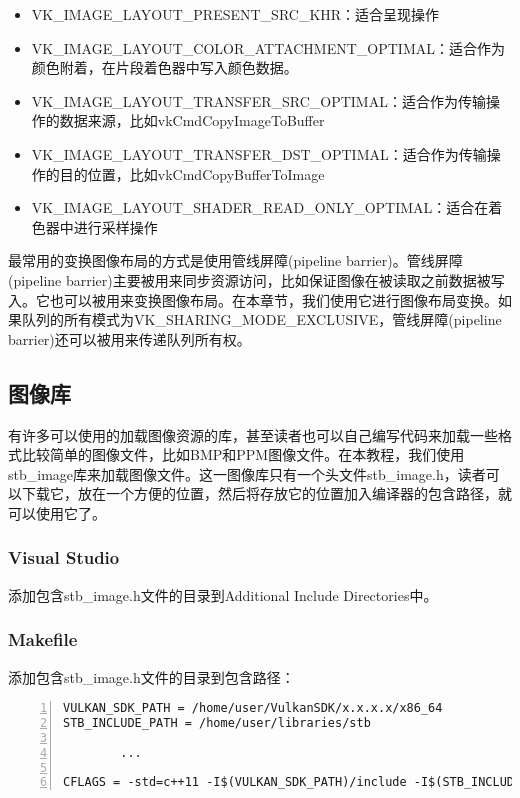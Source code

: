 \documentclass{ctexart}
\begin{document}
\begin{itemize}
	\item VK\_IMAGE\_LAYOUT\_PRESENT\_SRC\_KHR：适合呈现操作
	\item VK\_IMAGE\_LAYOUT\_COLOR\_ATTACHMENT\_OPTIMAL：适合作为颜色附着，在片段着色器中写入颜色数据。
	\item VK\_IMAGE\_LAYOUT\_TRANSFER\_SRC\_OPTIMAL：适合作为传输操作的数据来源，比如vkCmdCopyImageToBuffer
	\item VK\_IMAGE\_LAYOUT\_TRANSFER\_DST\_OPTIMAL：适合作为传输操作的目的位置，比如vkCmdCopyBufferToImage
	\item VK\_IMAGE\_LAYOUT\_SHADER\_READ\_ONLY\_OPTIMAL：适合在着色器中进行采样操作
\end{itemize}

最常用的变换图像布局的方式是使用管线屏障(pipeline barrier)。管线屏障(pipeline barrier)主要被用来同步资源访问，比如保证图像在被读取之前数据被写入。它也可以被用来变换图像布局。在本章节，我们使用它进行图像布局变换。如果队列的所有模式为VK\_SHARING\_MODE\_EXCLUSIVE，管线屏障(pipeline barrier)还可以被用来传递队列所有权。

\subsection{图像库}

有许多可以使用的加载图像资源的库，甚至读者也可以自己编写代码来加载一些格式比较简单的图像文件，比如BMP和PPM图像文件。在本教程，我们使用stb\_image库来加载图像文件。这一图像库只有一个头文件stb\_image.h，读者可以下载它，放在一个方便的位置，然后将存放它的位置加入编译器的包含路径，就可以使用它了。

\subsubsection{Visual Studio}

添加包含stb\_image.h文件的目录到Additional Include Directories中。

\subsubsection{Makefile}

添加包含stb\_image.h文件的目录到包含路径：

\begin{lstlisting}[language={[ANSI]C},keywordstyle=\color{blue!70},commentstyle=\color{red!50!green!50!blue!50},frame=shadowbox, rulesepcolor=\color{red!20!green!20!blue!20},basicstyle=\small,numbers=left, numberstyle=\tiny,breaklines=true]
VULKAN_SDK_PATH = /home/user/VulkanSDK/x.x.x.x/x86_64
STB_INCLUDE_PATH = /home/user/libraries/stb

		...

CFLAGS = -std=c++11 -I$(VULKAN_SDK_PATH)/include -I$(STB_INCLUDE_PATH)
\end{lstlisting}
\end{document}
